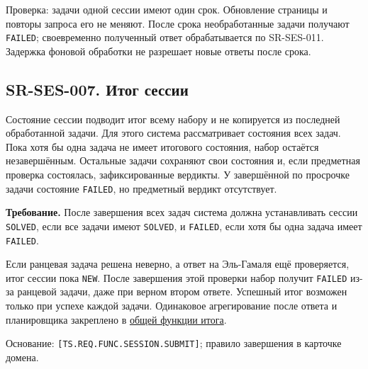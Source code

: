 \documentclass[12pt,a4paper]{article}
\begin{document}
Проверка: задачи одной сессии имеют один срок. Обновление страницы и повторы запроса его не меняют. После срока необработанные задачи получают \texttt{FAILED}; своевременно полученный ответ обрабатывается по SR-SES-011. Задержка фоновой обработки не разрешает новые ответы после срока.

\subsection{SR-SES-007. Итог сессии}\label{sr-ses-007-ux438ux442ux43eux433-ux441ux435ux441ux441ux438ux438}

\hypertarget{sr-ses-007-итог-сессии}{}

Состояние сессии подводит итог всему набору и не копируется из последней обработанной задачи. Для этого система рассматривает состояния всех задач. Пока хотя бы одна задача не имеет итогового состояния, набор остаётся незавершённым. Остальные задачи сохраняют свои состояния и, если предметная проверка состоялась, зафиксированные вердикты. У завершённой по просрочке задачи состояние \texttt{FAILED}, но предметный вердикт отсутствует.

\textbf{Требование.} После завершения всех задач система должна устанавливать сессии \texttt{SOLVED}, если все задачи имеют \texttt{SOLVED}, и \texttt{FAILED}, если хотя бы одна задача имеет \texttt{FAILED}.

Если ранцевая задача решена неверно, а ответ на Эль-Гамаля ещё проверяется, итог сессии пока \texttt{NEW}. После завершения этой проверки набор получит \texttt{FAILED} из-за ранцевой задачи, даже при верном втором ответе. Успешный итог возможен только при успехе каждой задачи. Одинаковое агрегирование после ответа и планировщика закреплено в \href{../07_\%D0\%9F\%D1\%80\%D0\%BE\%D0\%B3\%D1\%80\%D0\%B0\%D0\%BC\%D0\%BC\%D0\%BD\%D1\%8B\%D0\%B5_\%D1\%82\%D1\%80\%D0\%B5\%D0\%B1\%D0\%BE\%D0\%B2\%D0\%B0\%D0\%BD\%D0\%B8\%D1\%8F/DOC-06.2_\%D0\%A1\%D0\%B5\%D1\%81\%D1\%81\%D0\%B8\%D0\%B8_\%D0\%B7\%D0\%B0\%D0\%B4\%D0\%B0\%D1\%87_\%D0\%B8_\%D0\%BF\%D0\%BB\%D0\%B0\%D0\%BD\%D0\%B8\%D1\%80\%D0\%BE\%D0\%B2\%D1\%89\%D0\%B8\%D0\%BA.pdf\#nameddest=swr-ses-018-\%D0\%BE\%D0\%B1\%D1\%89\%D0\%B0\%D1\%8F-\%D1\%84\%D1\%83\%D0\%BD\%D0\%BA\%D1\%86\%D0\%B8\%D1\%8F-\%D0\%B8\%D1\%82\%D0\%BE\%D0\%B3\%D0\%B0-\%D1\%81\%D0\%B5\%D1\%81\%D1\%81\%D0\%B8\%D0\%B8}{общей функции итога}.

Основание: \texttt{[TS.\allowbreak{}REQ.\allowbreak{}FUNC.\allowbreak{}SESSION.\allowbreak{}SUBMIT]}; правило завершения в карточке домена.
\end{document}
